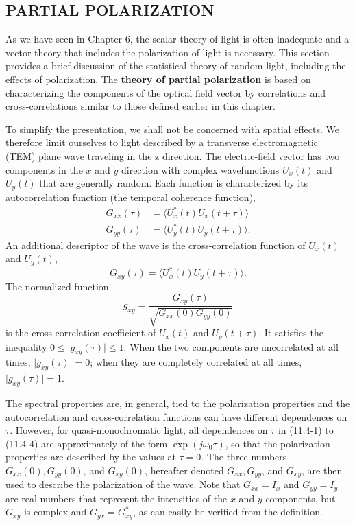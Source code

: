 \documentclass{article}
\numberwithin{figure}{subsection}
\numberwithin{table}{subsection}
\begin{document}
\bigbreak\begingroup
\color{ksc}
\subsection{PARTIAL POLARIZATION}
\endgroup
As we have seen in Chapter 6, the scalar theory of light is often inadequate and a vector theory that includes the polarization of light is necessary. This section provides a brief discussion of the statistical theory of random light, including the effects of polarization. The \textbf{theory of partial polarization} is based on characterizing the components of the optical field vector by correlations and cross-correlations similar to those defined earlier in this chapter.
\par To simplify the presentation, we shall not be concerned with spatial effects. We therefore limit ourselves to light described by a transverse electromagnetic (TEM) plane wave traveling in the z direction. The electric-field vector has two components in the $x$ and $y$ direction with complex wavefunctions $U_x (t)$ and $U_y (t)$ that are generally random. Each function is characterized by its autocorrelation function (the temporal coherence function),
\begin{align}
G_{xx}(\tau) &= \langle U_x^\ast (t) U_x(t + \tau) \rangle \\
G_{yy}(\tau) &= \langle U_y^\ast (t) U_y(t + \tau) \rangle .
\end{align}
An additional descriptor of the wave is the cross-correlation function of $U_x (t)$ and $U_y (t)$,
\begin{equation}
G_{xy}(\tau) = \langle U_x^\ast (t) U_y(t + \tau) \rangle .
\end{equation}
The normalized function
\begin{equation}
g_{xy} = \frac{G_{xy}(\tau)}{\sqrt{G_{xx}(0)G_{yy}(0)}}
\end{equation}
is the cross-correlation coefficient of $U_x (t)$ and $U_y(t + \tau)$. It satisfies the inequality $0 \le \vert g_{xy}(\tau) \rvert \le 1$. When the two components are uncorrelated at all times, $\lvert g_{xy}(\tau) \rvert = 0$; when they are completely correlated at all times, $\lvert g_{xy}(\tau) \rvert = 1$.
\par The spectral properties are, in general, tied to the polarization properties and the autocorrelation and cross-correlation functions can have different dependences on $\tau$. However, for quasi-monochromatic light, all dependences on $\tau$ in (11.4-1) to (11.4-4) are approximately of the form $\exp (j\omega_0 \tau)$, so that the polarization properties are described by the values at $\tau = 0$. The three numbers $G_{xx}(0), G_{yy}(0)$, and $G_{xy}(0)$, hereafter denoted $G_{xx}, G_{yy}$, and $G_{xy}$, are then used to describe the polarization of the wave. Note that $G_{xx} = I_x$ and $G_{yy} = I_y$ are real numbers that represent the intensities of the $x$ and $y$ components, but $G_{xy}$ is complex and $G_{yx} = G_{xy}^\ast$, as can easily be verified from the definition.
\end{document}
